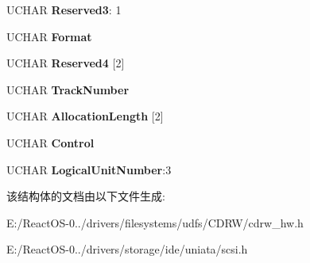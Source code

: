 \begin{DoxyCompactItemize}
U\+C\+H\+AR {\bfseries Reserved3}\+: 1
\item 
\mbox{\label{struct___c_d_b_1_1___s_u_b_c_h_a_n_n_e_l_aeb219c36cf59ab47470fa056214fe1aa}} 
U\+C\+H\+AR {\bfseries Format}
\item 
\mbox{\label{struct___c_d_b_1_1___s_u_b_c_h_a_n_n_e_l_ae2b0ba0269c4da554c578e1ea301ad7d}} 
U\+C\+H\+AR {\bfseries Reserved4} \mbox{[}2\mbox{]}
\item 
\mbox{\label{struct___c_d_b_1_1___s_u_b_c_h_a_n_n_e_l_a9f9ed1b120d95922895c5248c72fd4af}} 
U\+C\+H\+AR {\bfseries Track\+Number}
\item 
\mbox{\label{struct___c_d_b_1_1___s_u_b_c_h_a_n_n_e_l_a3f3fb1efa05d892d6148f0dee91ef3e0}} 
U\+C\+H\+AR {\bfseries Allocation\+Length} \mbox{[}2\mbox{]}
\item 
\mbox{\label{struct___c_d_b_1_1___s_u_b_c_h_a_n_n_e_l_a72ea325c080934444671a943e6f4bbd9}} 
U\+C\+H\+AR {\bfseries Control}
\item 
\mbox{\label{struct___c_d_b_1_1___s_u_b_c_h_a_n_n_e_l_a20d3be0d7e48aed2ff6fc52bd06584c6}} 
U\+C\+H\+AR {\bfseries Logical\+Unit\+Number}\+:3
\end{DoxyCompactItemize}


该结构体的文档由以下文件生成\+:\begin{DoxyCompactItemize}
\item 
E\+:/\+React\+O\+S-\/0../drivers/filesystems/udfs/\+C\+D\+R\+W/cdrw\+\_\+hw.\+h\item 
E\+:/\+React\+O\+S-\/0../drivers/storage/ide/uniata/scsi.\+h\end{DoxyCompactItemize}
